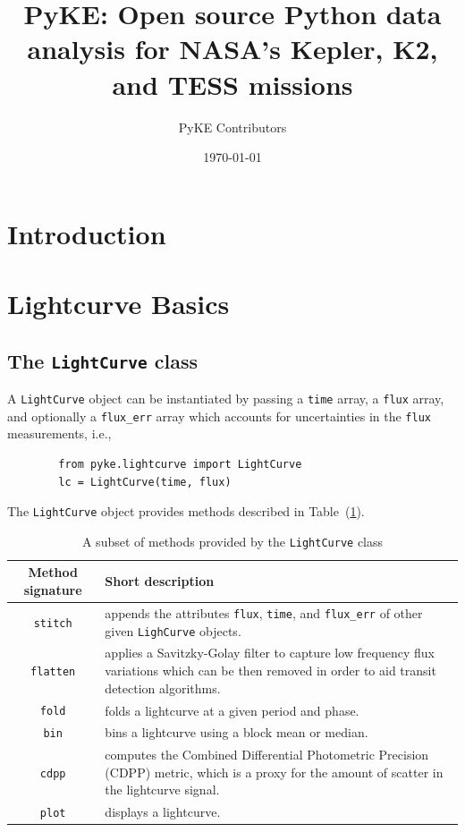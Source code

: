 \documentclass{article}
\title{PyKE: Open source Python data analysis for NASA's Kepler, K2, and TESS missions}
\author{PyKE Contributors}
\date{\today}
\begin{document}
\maketitle

\begin{abstract}

\end{abstract}

\section{Introduction}

\section{Lightcurve Basics}
    \subsection{The \texttt{LightCurve} class}
        A \texttt{LightCurve} object can be instantiated by passing a \texttt{time}
        array, a \texttt{flux} array, and optionally a \texttt{flux\_err} array which
        accounts for uncertainties in the \texttt{flux} measurements, i.e.,
        \begin{verbatim}
        from pyke.lightcurve import LightCurve
        lc = LightCurve(time, flux)
        \end{verbatim}

        The \texttt{LightCurve} object provides methods described in
        Table~(\ref{tab:methods}).

        \begin{table}[!htb]
            \centering
            \caption{A subset of methods provided by the \texttt{LightCurve} class}
            \begin{tabular}{cp{7cm}}
                \hline
                \textbf{Method signature} & \textbf{Short description} \\
                \hline
                \texttt{stitch} & appends the attributes \texttt{flux},
                \texttt{time}, and \texttt{flux\_err} of other given
                \texttt{LighCurve} objects.\\
                \texttt{flatten} & applies a Savitzky-Golay filter to capture
                low frequency flux variations which can be then removed in order
                to aid transit detection algorithms.\\
                \texttt{fold} & folds a lightcurve at a given period and phase.\\
                \texttt{bin} &  bins a lightcurve using a block mean or median.\\
                \texttt{cdpp} &  computes the Combined Differential Photometric
                Precision (CDPP) metric, which is a proxy for the amount of
                scatter in the lightcurve signal. \\
                \texttt{plot} & displays a lightcurve.
            \end{tabular}
            \label{tab:methods}
        \end{table}
\end{document}
